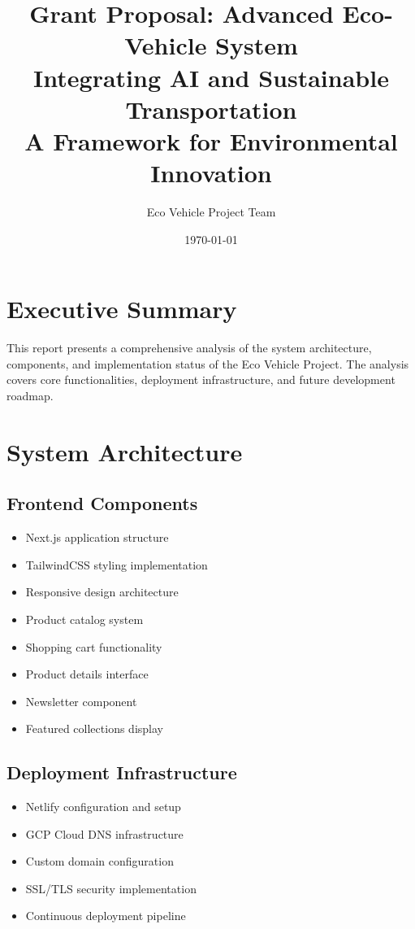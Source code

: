 \documentclass[12pt,a4paper]{article}
\title{Grant Proposal: Advanced Eco-Vehicle System\\[1ex]
Integrating AI and Sustainable Transportation\\[2ex]
\large A Framework for Environmental Innovation}
\author{Eco Vehicle Project Team}
\date{\today}
\begin{document}
\maketitle
\tableofcontents
\newpage

\section{Executive Summary}
This report presents a comprehensive analysis of the system architecture, components, and implementation status of the Eco Vehicle Project. The analysis covers core functionalities, deployment infrastructure, and future development roadmap.

\section{System Architecture}
\subsection{Frontend Components}
\begin{itemize}
    \item Next.js application structure
    \item TailwindCSS styling implementation
    \item Responsive design architecture
    \item Product catalog system
    \item Shopping cart functionality
    \item Product details interface
    \item Newsletter component
    \item Featured collections display
\end{itemize}

\subsection{Deployment Infrastructure}
\begin{itemize}
    \item Netlify configuration and setup
    \item GCP Cloud DNS infrastructure
    \item Custom domain configuration
    \item SSL/TLS security implementation
    \item Continuous deployment pipeline
\end{itemize}
\end{document}
